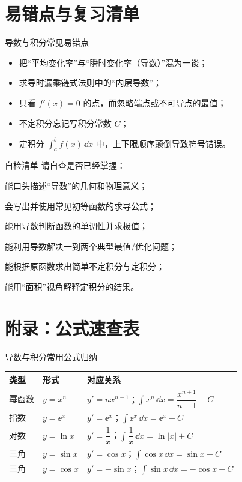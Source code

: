 \documentclass[a4paper,11pt]{ctexart}
\begin{document}
\section{易错点与复习清单}

\begin{warningbox}{导数与积分常见易错点}
\begin{itemize}
  \item 把“平均变化率”与“瞬时变化率（导数）”混为一谈；
  \item 求导时漏乘链式法则中的“内层导数”；
  \item 只看 $f'(x)=0$ 的点，而忽略端点或不可导点的最值；
  \item 不定积分忘记写积分常数 $C$；
  \item 定积分 $\int_a^b f(x)\,\dd x$ 中，上下限顺序颠倒导致符号错误。
\end{itemize}
\end{warningbox}

\begin{summarybox}{自检清单}
请自查是否已经掌握：
\begin{focuspoints}
  \item 能口头描述“导数”的几何和物理意义；
  \item 会写出并使用常见初等函数的求导公式；
  \item 能用导数判断函数的单调性并求极值；
  \item 能利用导数解决一到两个典型最值/优化问题；
  \item 能根据原函数求出简单不定积分与定积分；
  \item 能用“面积”视角解释定积分的结果。
\end{focuspoints}
\end{summarybox}

\section*{附录：公式速查表}

\begin{summarybox}{导数与积分常用公式归纳}
\begin{center}
\begin{tabular}{lll}
\toprule
类型 & 形式 & 对应关系 \\
\midrule
幂函数 & $y=x^n$ & $y'=nx^{n-1}$；$\displaystyle\int x^n\,\dd x=\dfrac{x^{n+1}}{n+1}+C$ \\
指数 & $y=\ee^x$ & $y'=\ee^x$；$\displaystyle\int \ee^x\,\dd x=\ee^x+C$ \\
对数 & $y=\ln x$ & $y'=\dfrac{1}{x}$；$\displaystyle\int \dfrac1x\,\dd x=\ln|x|+C$ \\
三角 & $y=\sin x$ & $y'=\cos x$；$\displaystyle\int \cos x\,\dd x=\sin x+C$ \\
三角 & $y=\cos x$ & $y'=-\sin x$；$\displaystyle\int \sin x\,\dd x=-\cos x+C$ \\
\bottomrule
\end{tabular}
\end{center}
\end{summarybox}

\ifdefined\MathNoteBookMode\else
\end{document}
